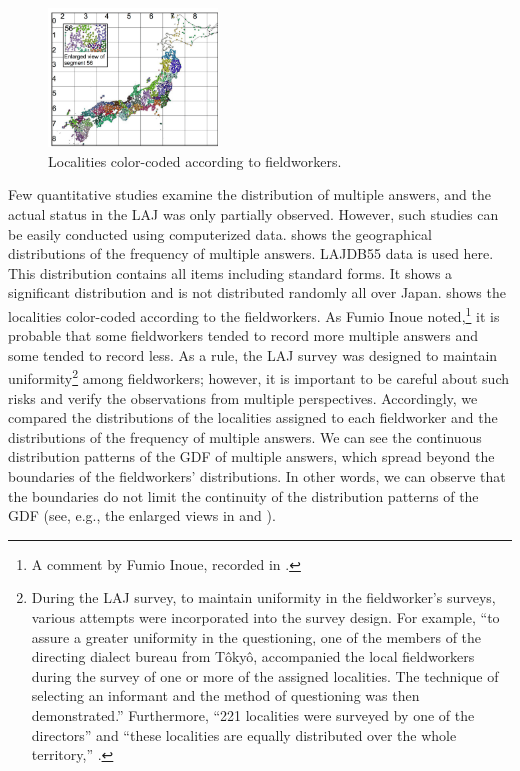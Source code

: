 \documentclass[output=paper]{LSP/langsci}
\begin{document}
\begin{figure}
\includegraphics[width=0.4\textwidth]{illustrations/kuma_fig15}
\caption{Localities color-coded according to fieldworkers.}  \label{fig:15}
\end{figure}

Few quantitative studies examine the distribution of multiple answers, and the actual status in the LAJ was only partially observed. However, such studies can be easily conducted using computerized data.  shows the geographical distributions of the frequency of multiple answers. LAJDB55 data is used here. This distribution contains all items including standard forms. It shows a significant distribution and is not distributed randomly all over Japan.  shows the localities color-coded according to the fieldworkers. As Fumio Inoue noted,\footnote{ A comment by Fumio Inoue, recorded in \citet[6]{inagaki_hogen_1980}.} it is probable that some fieldworkers tended to record more multiple answers and some tended to record less. As a rule, the LAJ survey was designed to maintain uniformity\footnote{During the LAJ survey, to maintain uniformity in the fieldworker’s surveys, various attempts were incorporated into the survey design. For example, “to assure a greater uniformity in the questioning, one of the members of the directing dialect bureau from Tôkyô, accompanied the local fieldworkers during the survey of one or more of the assigned localities. The technique of selecting an informant and the method of questioning was then demonstrated.” Furthermore, “221 localities were surveyed by one of the directors” and “these localities are equally distributed over the whole territory,” \citep[23, 40--41]{kokuritsu_kokugo_kenkyujo_nlri_nihon_1966}.} among fieldworkers; however, it is important to be careful about such risks and verify the observations from multiple perspectives. Accordingly, we compared the distributions of the localities assigned to each fieldworker and the distributions of the frequency of multiple answers. We can see the continuous distribution patterns of the GDF of multiple answers, which spread beyond the boundaries of the fieldworkers’ distributions. In other words, we can observe that the boundaries do not limit the continuity of the distribution patterns of the GDF (see, e.g., the enlarged views in  and ).
\end{document}
